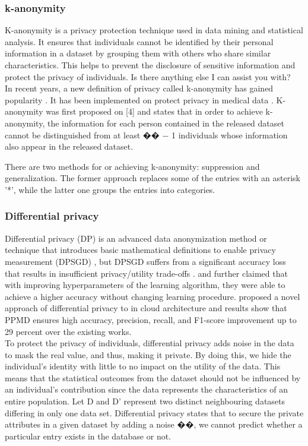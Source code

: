 \subsubsection{ k-anonymity}
K-anonymity is a privacy protection technique used in data mining and statistical analysis. It ensures that individuals cannot be identified by their personal information in a dataset by grouping them with others who share similar characteristics. This helps to prevent the disclosure of sensitive information and protect the privacy of individuals. Is there anything else I can assist you with?\\
In recent years, a new definition of privacy called k-anonymity has gained popularity \cite{sweeney2002k,murthy2019comparative}. It has been implemented on protect privacy in medical data \cite{el2008protecting}.
K-anonymity was first proposed on [4] and states that in order to achieve k-anonymity, the information for each person contained in the released dataset cannot be distinguished from at least �� − 1 individuals whose information also appear in the released dataset.

There are two methods for or achieving k-anonymity: suppression and generalization. The former approach replaces some of the entries with an asterisk ’*’, while the latter one groups the entries into categories.
\subsubsection{Differential privacy}
Differential privacy (DP) is an advanced data anonymization method or technique that introduces basic mathematical definitions to enable privacy measurement (DPSGD)\cite{arous2023exploring,ponomareva2023dp,horlboge2022still} , but DPSGD suffers from a significant accuracy loss that results in insufficient privacy/utility trade-offs . \cite{arous2023exploring} and further claimed that with improving hyperparameters of the learning algorithm, they were able to achieve a higher accuracy without changing learning procedure. \cite{singh2022privacy} proposed a novel approach of differential privacy to in cloud architecture and results show that PPMD ensures high accuracy, precision, recall, and F1-score improvement up to 29 percent over the existing works.\\
To protect the privacy of individuals, differential privacy adds noise in the data to mask the real value, and thus, making it private. By doing this, we hide the individual’s identity with little to no impact on the utility of the data. This means that the statistical outcomes from the dataset should not be influenced by an individual’s contribution since the data represents the characteristics of an entire population. Let D and D’ represent two distinct neighbouring datasets differing in only one data set. Differential privacy states that to secure the private attributes in a given dataset by adding a noise ��, we cannot predict whether a particular entry exists in the database or not. 
 
